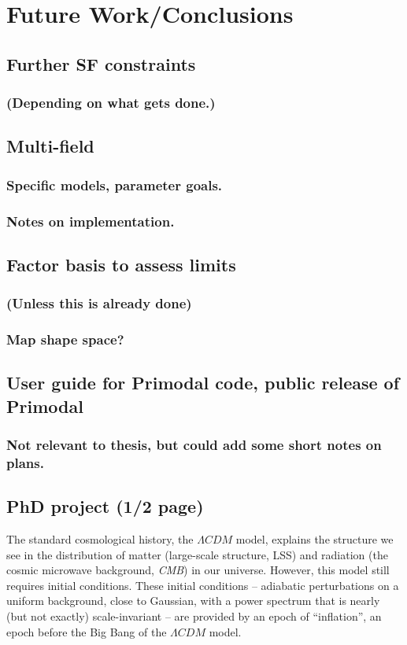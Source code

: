 \chapter{Future Work/Conclusions}
\section{Further SF constraints}
    \subsection{(Depending on what gets done.)}
\section{Multi-field}
    \subsection{Specific models, parameter goals.}
    \subsection{Notes on implementation.}
\section{Factor basis to assess limits}
    \subsection{(Unless this is already done)}
    \subsection{Map shape space?}
\section{User guide for Primodal code, public release of Primodal}
    \subsection{Not relevant to thesis, but could add some short notes on plans.}


\section*{PhD project (1/2 page)}
The standard cosmological history, the $\Lambda CDM$ model, explains the structure we see in the distribution of matter (large-scale structure, LSS) and radiation (the cosmic microwave background, \textit{CMB}) in our universe. However, this model still requires initial conditions. These initial conditions – adiabatic perturbations on a uniform background, close to Gaussian, with a power spectrum that is nearly (but not exactly) scale-invariant – are provided by an epoch of “inflation”, an epoch before the Big Bang of the $\Lambda CDM$ model. 


